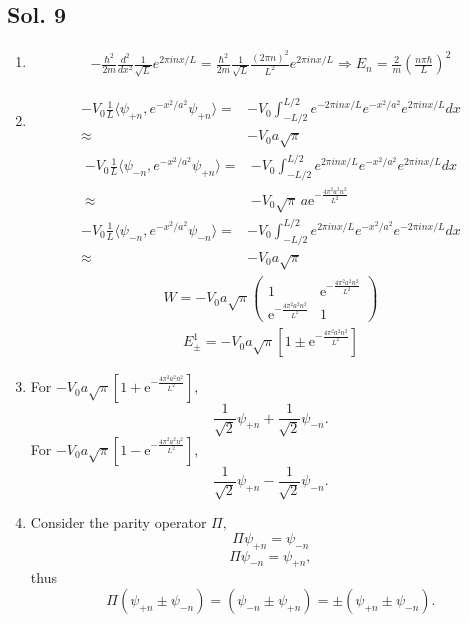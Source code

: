 \subsection*{Sol. 9}
\begin{enumerate}
    \item 
    \begin{align*}
        -\frac{\hbar^2}{2m}\frac{d^2}{dx^2}
        \frac{1}{\sqrt{L}}e^{2\pi inx/L}
        =\frac{\hbar^2}{2m}
        \frac{1}{\sqrt{L}}
        \frac{(2\pi n)^2}{L^2}
        e^{2\pi inx/L}\Rightarrow 
        E_n=\frac{2}{m}\left(\frac{n\pi\hbar}{L}\right)^2
    \end{align*}
    \item 
    \begin{align*}
        -V_0\frac{1}{L}\langle \psi_{+n}, e^{-x^2/a^2}\psi_{+n}\rangle
        =&-V_0\int_{-L/2}^{L/2}
        e^{-2\pi inx/L}e^{-x^2/a^2}e^{2\pi inx/L}dx\\
        \approx&-V_0a\sqrt{\pi}
    \end{align*}
    \begin{align*}
        -V_0\frac{1}{L}\langle \psi_{-n}, e^{-x^2/a^2}\psi_{+n}\rangle
        =&-V_0\int_{-L/2}^{L/2}
        e^{2\pi inx/L}e^{-x^2/a^2}e^{2\pi inx/L}dx\\
        \approx&-V_0
        \sqrt{\pi} \, a\mathrm{e}^{-\frac{4\pi^{2} a^{2} n^{2}}{L^{2}}}
    \end{align*}
    \begin{align*}
        -V_0\frac{1}{L}\langle \psi_{-n}, e^{-x^2/a^2}\psi_{-n}\rangle
        =&-V_0\int_{-L/2}^{L/2}
        e^{2\pi inx/L}e^{-x^2/a^2}e^{-2\pi inx/L}dx\\
        \approx&-V_0a\sqrt{\pi}
    \end{align*}
    \begin{align*}
        W = 
        -V_0a\sqrt{\pi}
        \begin{pmatrix}
            1 & \mathrm{e}^{-\frac{4\pi^{2} a^{2} n^{2}}{L^{2}}}\\
           \mathrm{e}^{-\frac{4\pi^{2} a^{2} n^{2}}{L^{2}}} & 1
        \end{pmatrix}
    \end{align*}
    \begin{align*}
        E_{\pm}^1 = -V_0a\sqrt{\pi}
        \left[1\pm \mathrm{e}^{-\frac{4\pi^{2} a^{2} n^{2}}{L^{2}}}\right]
    \end{align*}
    \item 
    For $-V_0a\sqrt{\pi}
        \left[1 + \mathrm{e}^{-\frac{4\pi^{2} a^{2} n^{2}}{L^{2}}}\right],$
    $$
    \frac{1}{\sqrt{2}}\psi_{+n} + \frac{1}{\sqrt{2}}\psi_{-n}.
    $$
    For $-V_0a\sqrt{\pi}
        \left[1 - \mathrm{e}^{-\frac{4\pi^{2} a^{2} n^{2}}{L^{2}}}\right],$
    $$
    \frac{1}{\sqrt{2}}\psi_{+n} - \frac{1}{\sqrt{2}}\psi_{-n}.
    $$
    \item 
    Consider the parity operator $\Pi,$
    $$
    \Pi \psi_{+n} = \psi_{-n}
    $$
    $$
    \Pi \psi_{-n} = \psi_{+n},
    $$
    thus 
    $$
    \Pi(\psi_{+n}\pm \psi_{-n}) = 
    (\psi_{-n}\pm \psi_{+n}) =
    \pm(\psi_{+n}\pm \psi_{-n}).
    $$
\end{enumerate}

